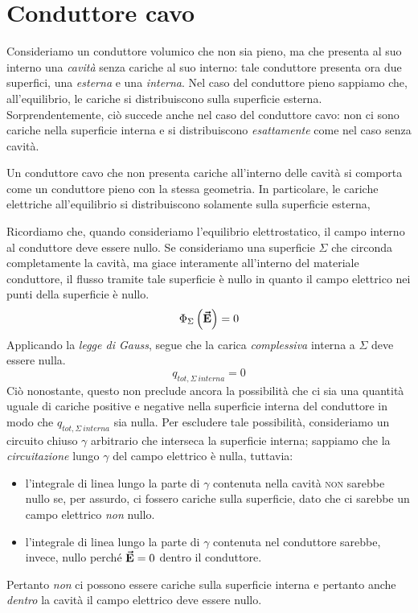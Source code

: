 \section{Conduttore cavo}
Consideriamo un conduttore volumico che non sia pieno, ma che presenta al suo interno una \textit{cavità} senza cariche al suo interno: tale conduttore presenta ora due superfici, una \textit{esterna} e una \textit{interna}. Nel caso del conduttore pieno sappiamo che, all'equilibrio, le cariche si distribuiscono sulla superficie esterna.\\
Sorprendentemente, ciò succede anche nel caso del conduttore cavo: non ci sono cariche nella superficie interna e si distribuiscono \textit{esattamente} come nel caso senza cavità.
\begin{proposition}
	Un conduttore cavo che non presenta cariche all'interno delle cavità si comporta come un conduttore pieno con la stessa geometria. In particolare, le cariche elettriche all'equilibrio si distribuiscono solamente sulla superficie esterna,
\end{proposition}
\begin{demonstration}
	Ricordiamo che, quando consideriamo l'equilibrio elettrostatico, il campo interno al conduttore deve essere nullo. Se consideriamo una superficie $\Sigma$ che circonda completamente la cavità, ma giace interamente all'interno del materiale conduttore, il flusso tramite tale superficie è nullo in quanto il campo elettrico nei punti della superficie è nullo.
	\begin{equation*}
		\Phi_{\Sigma}\left(\vb*{\va{E}}\right)=0
	\end{equation*}
Applicando la \textit{legge di Gauss}, segue che la carica \textit{complessiva} interna a $\Sigma$ deve essere nulla.
\begin{equation}
	q_{tot,\Sigma\ interna}=0
\end{equation}
Ciò nonostante, questo non preclude ancora la possibilità che ci sia una quantità uguale di cariche positive e negative nella superficie interna del conduttore in modo che	$q_{tot,\Sigma\ interna}$ sia nulla. Per escludere tale possibilità, consideriamo un circuito chiuso $\gamma$ arbitrario che interseca la superficie interna; sappiamo che la \textit{circuitazione} lungo $\gamma$ del campo elettrico è nulla, tuttavia:
\begin{itemize}
	\item l'integrale di linea lungo la parte di $\gamma$ contenuta nella cavità \textsc{non} sarebbe nullo se, per assurdo, ci fossero cariche sulla superficie, dato che ci sarebbe un campo elettrico \textit{non} nullo.
	\item l'integrale di linea lungo la parte di $\gamma$ contenuta nel conduttore sarebbe, invece, nullo perché $\vb*{\va{E}}=0$ dentro il conduttore.
\end{itemize}
Pertanto \textit{non} ci possono essere cariche sulla superficie interna e pertanto anche \textit{dentro} la cavità il campo elettrico deve essere nullo.
\end{demonstration}

